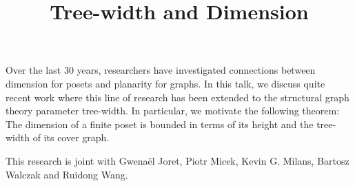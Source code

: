 \title{Tree-width and Dimension}
\endtitle

Over the last 30 years, researchers have
investigated connections between
dimension for posets and planarity for graphs.  In this
talk, we discuss quite recent work where this line
of research has been extended to the structural
graph theory parameter tree-width.  In particular,
we motivate the following theorem: The dimension of a finite poset
is bounded in terms of its height and the tree-width
of its cover graph.

This research is joint with Gwena\"{e}l Joret,
Piotr Micek, Kevin G. Milans, Bartosz Walczak and
Ruidong Wang.
